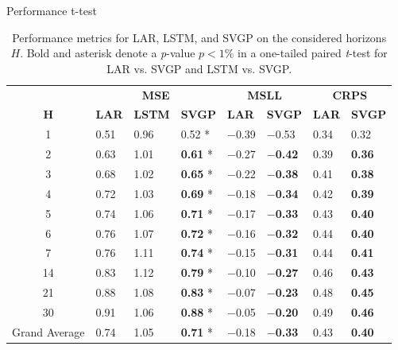 \begin{frame}{Performance t-test}
	\tiny
	\begin{table}[htbp]
		\caption{Performance metrics for LAR, LSTM, and SVGP on the considered horizons $H$. Bold and asterisk denote a \emph{p}-value $p<1\%$ in a one-tailed paired \emph{t}-test for LAR vs. SVGP and LSTM vs. SVGP.}
		\label{tab:metrics}
		\begin{tabular}{c p{1cm}p{1.0cm}p{1.0cm}p{1.0cm}p{1.0cm}p{1.0cm}p{1.0cm}}
			\toprule
			& \multicolumn{3}{c}{\textbf{MSE}} & \multicolumn{2}{c}{\textbf{MSLL}} & \multicolumn{2}{c}{\textbf{CRPS}} \\
			\cmidrule{2-8}
			\( \textbf{H} \) & \textbf{LAR} & \textbf{LSTM} & \textbf{SVGP} & \textbf{LAR} & \textbf{SVGP} & \textbf{LAR} & \textbf{SVGP} \\
			\midrule
			1  & 0.51 & 0.96 & 0.52 * & $-$0.39 & $-$0.53 & 0.34 & 0.32 \\
			2  & 0.63 & 1.01 & \textbf{0.61} * & $-$0.27 & \textbf{$-$0.42} & 0.39 & \textbf{0.36} \\
			3  & 0.68 & 1.02 & \textbf{0.65} * & $-$0.22 & \textbf{$-$0.38} & 0.41 & \textbf{0.38} \\
			4  & 0.72 & 1.03 & \textbf{0.69} * & $-$0.18 & \textbf{$-$0.34} & 0.42 & \textbf{0.39} \\
			5  & 0.74 & 1.06 & \textbf{0.71} * & $-$0.17 & \textbf{$-$0.33} & 0.43 & \textbf{0.40} \\
			6  & 0.76 & 1.07 & \textbf{0.72} * & $-$0.16 & \textbf{$-$0.32} & 0.44 & \textbf{0.40} \\
			7  & 0.76 & 1.11 & \textbf{0.74} * & $-$0.15 & \textbf{$-$0.31} & 0.44 & \textbf{0.41} \\
			14 & 0.83 & 1.12 & \textbf{0.79} * & $-$0.10 & \textbf{$-$0.27} & 0.46 & \textbf{0.43} \\
			21 & 0.88 & 1.08 & \textbf{0.83} * & $-$0.07 & \textbf{$-$0.23} & 0.48 & \textbf{0.45} \\
			30 & 0.91 & 1.06 & \textbf{0.88} * & $-$0.05 & \textbf{$-$0.20} & 0.49 & \textbf{0.46} \\
			\midrule
			Grand Average & 0.74 & 1.05 & \textbf{0.71} * & $-$0.18 & \textbf{$-$0.33} & 0.43 & \textbf{0.40} \\
			\bottomrule
		\end{tabular}
		
	\end{table}
\end{frame}


